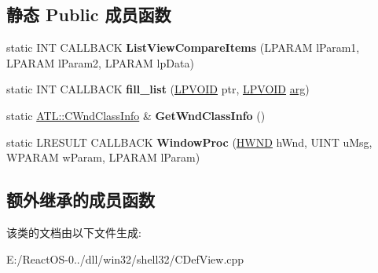 \subsection*{静态 Public 成员函数}
\begin{DoxyCompactItemize}
\item 
\mbox{\label{class_c_def_view_a94b280fb062647a8a5c035d6975612dc}} 
static I\+NT C\+A\+L\+L\+B\+A\+CK {\bfseries List\+View\+Compare\+Items} (L\+P\+A\+R\+AM l\+Param1, L\+P\+A\+R\+AM l\+Param2, L\+P\+A\+R\+AM lp\+Data)
\item 
\mbox{\label{class_c_def_view_a16732febde6a89b082099bc6e59c4b83}} 
static I\+NT C\+A\+L\+L\+B\+A\+CK {\bfseries fill\+\_\+list} (\hyperlink{interfacevoid}{L\+P\+V\+O\+ID} ptr, \hyperlink{interfacevoid}{L\+P\+V\+O\+ID} \hyperlink{interfacevoid}{arg})
\item 
\mbox{\label{class_c_def_view_aa3e4055c1b6292edbb6a2e8ed72d39f7}} 
static \hyperlink{struct_a_t_l_1_1___a_t_l___w_n_d_c_l_a_s_s_i_n_f_o_w}{A\+T\+L\+::\+C\+Wnd\+Class\+Info} \& {\bfseries Get\+Wnd\+Class\+Info} ()
\item 
\mbox{\label{class_c_def_view_aec485383112f9e73bc432e31a96a19c6}} 
static L\+R\+E\+S\+U\+LT C\+A\+L\+L\+B\+A\+CK {\bfseries Window\+Proc} (\hyperlink{interfacevoid}{H\+W\+ND} h\+Wnd, U\+I\+NT u\+Msg, W\+P\+A\+R\+AM w\+Param, L\+P\+A\+R\+AM l\+Param)
\end{DoxyCompactItemize}
\subsection*{额外继承的成员函数}


该类的文档由以下文件生成\+:\begin{DoxyCompactItemize}
\item 
E\+:/\+React\+O\+S-\/0../dll/win32/shell32/C\+Def\+View.\+cpp\end{DoxyCompactItemize}
